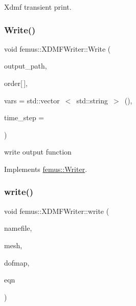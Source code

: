 Xdmf transient print. 

\mbox{\label{classfemus_1_1_x_d_m_f_writer_a01b6d71015768b64cff7adbc98a1ec8f}} 
\subsubsection{\texorpdfstring{Write()}{Write()}}
{\footnotesize\ttfamily void femus\+::\+X\+D\+M\+F\+Writer\+::\+Write (\begin{DoxyParamCaption}\item[{const std\+::string}]{output\+\_\+path,  }\item[{const char}]{order\mbox{[}$\,$\mbox{]},  }\item[{const std\+::vector$<$ std\+::string $>$ \&}]{vars = {\ttfamily std\+:\+:vector~$<$~std\+:\+:string~$>$~()},  }\item[{const unsigned}]{time\+\_\+step = {} }\end{DoxyParamCaption})\hspace{0.3cm}{\ttfamily [virtual]}}

write output function 

Implements \mbox{\hyperlink{classfemus_1_1_writer_aa0f7400e0546946f317cc361397d97bd}{femus\+::\+Writer}}.

\mbox{\label{classfemus_1_1_x_d_m_f_writer_af3d21c6aafbff12f1c9673b7a02b729f}} 
\subsubsection{\texorpdfstring{write()}{write()}}
{\footnotesize\ttfamily void femus\+::\+X\+D\+M\+F\+Writer\+::write (\begin{DoxyParamCaption}\item[{const std\+::string}]{namefile,  }\item[{const \mbox{\hyperlink{classfemus_1_1_multi_level_mesh_two}{Multi\+Level\+Mesh\+Two}} $\ast$}]{mesh,  }\item[{const \mbox{\hyperlink{classfemus_1_1_dof_map}{Dof\+Map}} $\ast$}]{dofmap,  }\item[{const \mbox{\hyperlink{classfemus_1_1_system_two}{System\+Two}} $\ast$}]{eqn }\end{DoxyParamCaption})\hspace{0.3cm}{\ttfamily [static]}}

